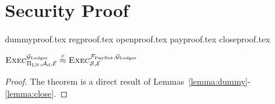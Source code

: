 \section{Security Proof}
  \label{appendix:secproof}
  {dummyproof.tex}
  {regproof.tex}
  {openproof.tex}
  {payproof.tex}
  {closeproof.tex}

  \begin{theorem}
    \label{theorem:simulation}
    \center $\textsc{Exec}^{\mathcal{G}_{\mathrm{Ledger}}}_{\Pi_{\mathrm{LN}},
    \mathcal{A}_{\mathrm{d}}, \mathcal{E}} \overset{c}{\approx}
    \textsc{Exec}^{\mathcal{F}_{\mathrm{PayNet}}, \mathcal{G}_{\mathrm{Ledger}}}_{\mathcal{S}, \mathcal{E}}$
  \end{theorem}

  \begin{proof}
    The theorem is a direct result of
    Lemmas~\ref{lemma:dummy}-\ref{lemma:close}.
  \end{proof}
